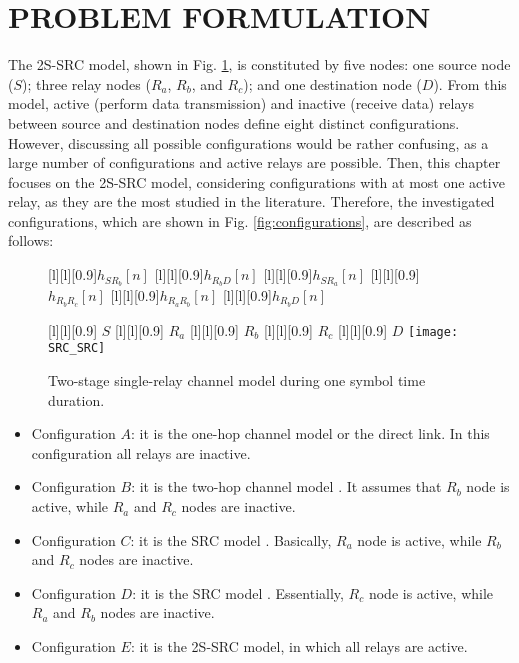 \section{PROBLEM FORMULATION} \label{sec:ProbForm_2S_SRC}

The \ac{2S-SRC} model, shown in Fig. \ref{fig:srcsrc}, is constituted by five nodes: one source node ($S$); three relay nodes ($R_{a}$, $R_{b}$, and $R_{c}$); and one destination node ($D$). From this model, active (perform data transmission) and inactive (receive data) relays between source and destination nodes define eight distinct configurations. However, discussing all possible configurations would be rather confusing, as a large number of configurations and active relays are possible. Then, this chapter focuses on the \ac{2S-SRC} model, considering configurations with at most one active relay, as they are the most studied in the literature. Therefore, the investigated configurations, which are shown in Fig. \ref{fig:configurations}, are described as follows:

\begin{figure}
	\centering
	[l][0.9]{$ h_{SR_{b}}[n] $}
	[l][0.9]{$ h_{R_{b}D}[n] $}
	[l][0.9]{$ h_{SR_{a}}[n] $}
	[l][0.9]{$ h_{R_{b}R_{c}}[n] $}
	[l][0.9]{$ h_{R_{a}R_{b}}[n] $}
	[l][0.9]{$ h_{R_{b}D}[n] $}
	
	[l][0.9]{\color{white} $S$}
	[l][0.9]{\color{white} $R_{a}$}
	[l][0.9]{\color{white} $R_{b}$}
	[l][0.9]{\color{white} $R_{c}$}
	[l][0.9]{\color{white} $D$}
	\texttt{[image: SRC\_SRC]}
	\caption{Two-stage single-relay channel model during one symbol time duration.}
	\label{fig:srcsrc}
\end{figure}

\begin{itemize}
	\item Configuration $A$: it is the one-hop channel model or the direct link. In this configuration all relays are inactive.
	\item Configuration $B$: it is the two-hop channel model \cite{Rabie2016}. It assumes that $R_b$ node is active, while $R_a$ and $R_c$ nodes are inactive.
	\item Configuration $C$: it is the \ac{SRC} model \cite{Michelle2016}. Basically, $R_a$ node is active, while $R_b$ and $R_c$ nodes are inactive.
	\item Configuration $D$: it is the \ac{SRC} model \cite{Michelle2016}. Essentially, $R_c$ node is active, while $R_a$ and $R_b$ nodes are inactive.
	\item Configuration $E$: it is the \ac{2S-SRC} model, in which all relays are active.
\end{itemize}

